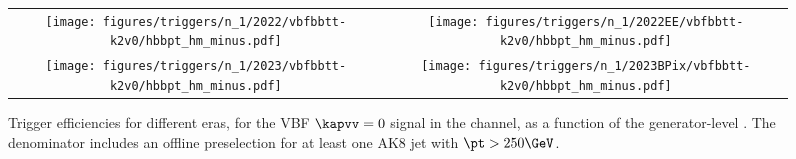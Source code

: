 
    \begin{figure}[H]
        \centering
        \begin{tabular}{cc}
            \texttt{[image: figures/triggers/n\_1/2022/vbfbbtt-k2v0/hbbpt\_hm\_minus.pdf]} &
            \texttt{[image: figures/triggers/n\_1/2022EE/vbfbbtt-k2v0/hbbpt\_hm\_minus.pdf]} \\[1ex]
            \texttt{[image: figures/triggers/n\_1/2023/vbfbbtt-k2v0/hbbpt\_hm\_minus.pdf]} &
            \texttt{[image: figures/triggers/n\_1/2023BPix/vbfbbtt-k2v0/hbbpt\_hm\_minus.pdf]}
            \label{fig}
        \end{tabular}
\caption{Trigger efficiencies for different eras, for the VBF \HHbbtt $\kapvv=0$ signal in the \tauhm channel, as a function of the generator-level \hbb \pt. The denominator includes an offline preselection for at least one AK8 jet with $\pt > 250\GeV$.}
\label{fig:triggers_n-1_vbfbbtt-k2v0_hm_hbbpt}
\end{figure}
